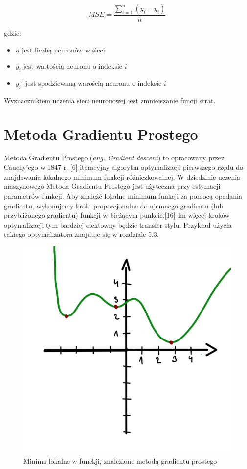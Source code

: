 \documentclass[openright]{xmgr}
\begin{document}
$$MSE=\frac{\sum_{i=1}^{n} (y_i - y_i)}{n}$$

gdzie: 

\begin{itemize}
\item $n$ jest liczbą neuronów w sieci
\item $y_i$ jest wartością neuronu o indeksie $i$ 
\item $y_i'$ jest spodziewaną warością neuronu o indeksie $i$ 
\end{itemize}

Wyznacznikiem uczenia sieci neuronowej jest zmniejszanie funcji strat. 


 \section{Metoda Gradientu Prostego\label{s:dsssl}}

\indent \indent Metoda Gradientu Prostego (\textit{ang. Gradient descent}) to opracowany przez Cauchy'ego w 1847 r. [6] iteracyjny algorytm optymalizacji pierwszego rzędu do znajdowania lokalnego minimum funkcji różniczkowalnej. W dziedzinie uczenia maszynowego Metoda Gradientu Prostego jest użyteczna przy estymacji parametrów funkcji. Aby znaleźć lokalne minimum funkcji za pomocą opadania gradientu, wykonujemy kroki proporcjonalne do ujemnego gradientu (lub przybliżonego gradientu) funkcji w bieżącym punkcie.[16] Im więcej kroków optymalizacji tym bardziej efektowny będzie transfer stylu.
Przykład użycia takiego optymalizatora znajduje się w rozdziale 5.3.


\begin{figure}[!tbh]
\centering
\includegraphics[width=.8\hsize]{fig/11}
\caption{Minima lokalne w funckji, znalezione metodą gradientu prostego\label{RYS.3}}
\end{figure}
\end{document}
